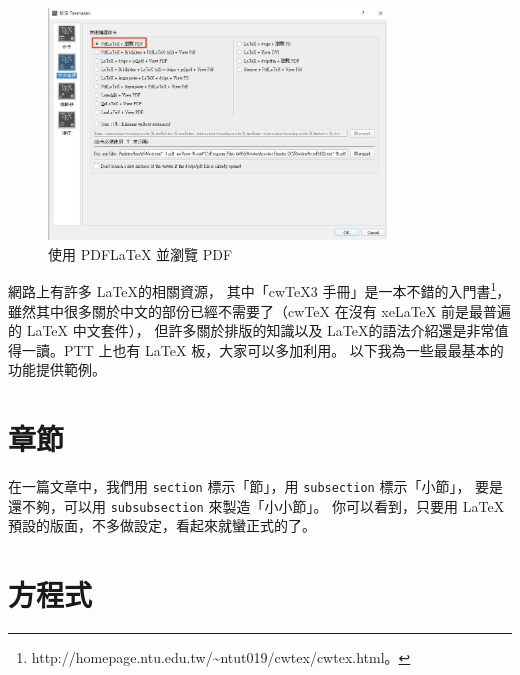 \documentclass[12pt, a4paper]{article}
\begin{document}
		\begin{figure}
		\centering
		\includegraphics[width=0.8\textwidth]{figures/compile2}
		\caption{使用 PDFLaTeX 並瀏覽 PDF}
		\label{fig:compile2}
		\end{figure}

網路上有許多 \LaTeX 的相關資源，
其中「cwTeX3 手冊」是一本不錯的入門書\footnote{http://homepage.ntu.edu.tw/\textasciitilde ntut019/cwtex/cwtex.html。}，
雖然其中很多關於中文的部份已經不需要了（cwTeX 在沒有 xeLaTeX 前是最普遍的 LaTeX 中文套件），
但許多關於排版的知識以及 \LaTeX 的語法介紹還是非常值得一讀。PTT 上也有 LaTeX 板，大家可以多加利用。
以下我為一些最最基本的功能提供範例。



















\section{章節}

在一篇文章中，我們用 \verb|section| 標示「節」，用 \verb|subsection| 標示「小節」，
要是還不夠，可以用 \verb|subsubsection| 來製造「小小節」。
你可以看到，只要用 \LaTeX 預設的版面，不多做設定，看起來就蠻正式的了。










\section{方程式}
\end{document}
